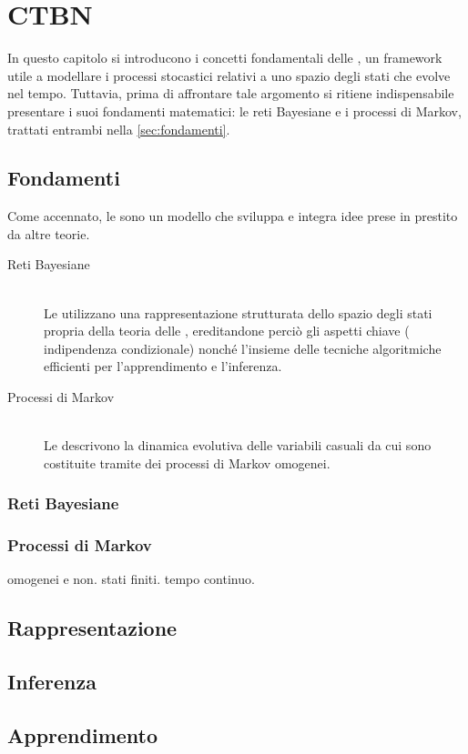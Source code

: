 
\chapter{CTBN}
\label{cap:ctbn}

In questo capitolo si introducono i concetti fondamentali delle \ctbn{}, un framework utile a modellare i processi stocastici relativi a uno spazio degli stati che evolve nel tempo.
Tuttavia, prima di affrontare tale argomento si ritiene indispensabile presentare i suoi fondamenti matematici: le reti Bayesiane e i processi di Markov, trattati entrambi nella \autoref{sec:fondamenti}.


\section{Fondamenti}
\label{sec:fondamenti}

Come accennato, le \ctbn{} sono un modello che sviluppa e integra idee prese in prestito da altre teorie.
\begin{description}
\item[Reti Bayesiane] \hfill \\
Le \ctbn{} utilizzano una rappresentazione strutturata dello spazio degli stati propria della teoria delle \bns{}, ereditandone perciò gli aspetti chiave (\ie{} indipendenza condizionale) nonché l'insieme delle tecniche algoritmiche efficienti per l'apprendimento e l'inferenza.
\item[Processi di Markov] \hfill \\
Le \ctbn{} descrivono la dinamica evolutiva delle variabili casuali da cui sono costituite tramite dei processi di Markov omogenei.
\end{description} 

\subsection{Reti Bayesiane}
\label{sec:bns}

\subsection{Processi di Markov}
\label{sec:mps}
omogenei e non. stati finiti. tempo continuo.


\section{Rappresentazione}


\section{Inferenza}


\section{Apprendimento}

